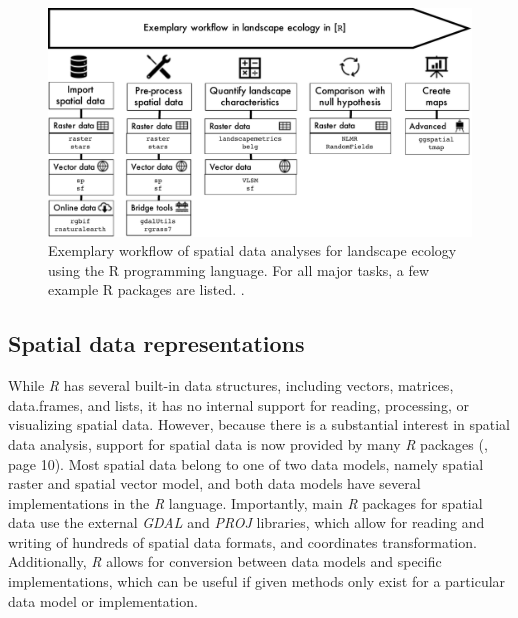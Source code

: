 \documentclass[smallextended]{svjour3}       %
\begin{document}
\begin{figure}
\includegraphics[width=1\linewidth,height=0.3\textheight]{data/Workflow} \caption{Exemplary workflow of spatial data analyses for landscape ecology using the R programming language. For all major tasks, a few example R packages are listed. .}\label{fig:fig-workflow}
\end{figure}

\hypertarget{sec:spatrep}{%
\subsection{Spatial data representations}\label{sec:spatrep}}

While \emph{R} has several built-in data structures, including vectors, matrices, data.frames, and lists, it has no internal support for reading, processing, or visualizing spatial data.
However, because there is a substantial interest in spatial data analysis, support for spatial data is now provided by many \emph{R} packages (\cite{Lovelace2019}, page 10).
Most spatial data belong to one of two data models, namely spatial raster and spatial vector model, and both data models have several implementations in the \emph{R} language.
Importantly, main \emph{R} packages for spatial data use the external \emph{GDAL} \cite{GDAL} and \emph{PROJ} \cite{PROJ} libraries, which allow for reading and writing of hundreds of spatial data formats, and coordinates transformation.
Additionally, \emph{R} allows for conversion between data models and specific implementations, which can be useful if given methods only exist for a particular data model or implementation.
\end{document}
